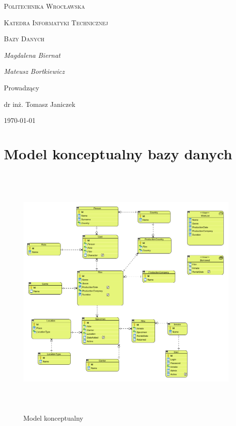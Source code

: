 \documentclass{article}
\begin{document}
	
	\begin{titlepage}
		\centering
		{\scshape\LARGE Politechnika Wrocławska \par}
		{\scshape\Large Katedra Informatyki Technicznej\par}
		
		\vspace{1.5cm}
		{\scshape\Huge Bazy Danych \par}
		\vspace{1.5cm}
		
		\vspace{2cm}
		{\Large\itshape Magdalena Biernat\par}
		{\Large\itshape Mateusz Bortkiewicz\par}
		\vfill\flushleft\large
		
		\normalsize	\centering	\vspace{3cm}
		Prowadzący\par
		dr inż. Tomasz Janiczek 
		
		\vfill
		{\large \today\par}
	\end{titlepage}
	\newpage
	\section{Model konceptualny bazy danych}
	\begin{figure}[!ht]	
		\centering
		\includegraphics[height=13cm]{model_konceptualny.png}
		\caption{Model konceptualny}
		\label{fig:obrazek 0}
	\end{figure}
	\newpage
\end{document}
